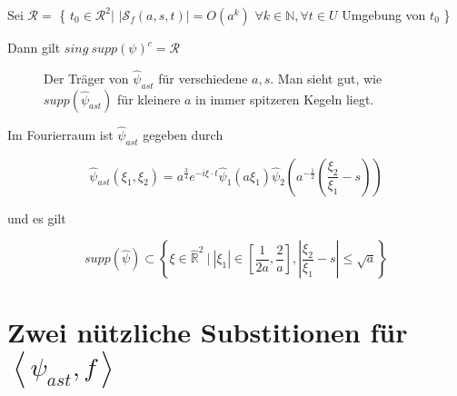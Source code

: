 \begin{corollary}
Sei $\mathcal{R} =$ \{
    $t_0 \in \mathcal{R}^2 \big|$ $|\mathcal{S}_f(a,s,t)| = O(a^k)$
    $\forall k \in \mathbb{N}, \forall t \in U$ Umgebung von $t_0$
    \}

    Dann gilt $sing ~supp (\psi)^c = \mathcal{R}$
\end{corollary}

\begin{remark}

\begin{figure}[h]
\centering

\label{fig:supp_psi_hat}
\caption{Der Träger von $\hat \psi_{ast}$ für verschiedene $a, s$. Man sieht gut,
wie $supp (\hat \psi_{ast})$ für kleinere $a$ in immer spitzeren Kegeln liegt.}
\end{figure}

\label{cor:psi_hat}
Im Fourierraum ist $\hat{\psi}_{ast}$ gegeben durch

\begin{equation}
    \hat \psi_{ast}{(\xi_1, \xi_2)} = a^{\frac{3}{4}}e^{-i\xi \cdot t}\hat\psi_1(a \xi_1) \hat\psi_{2}\left(a^{-\frac{1}{2}}\left(\frac{\xi_2}{\xi_1}-s\right)\right)
\end{equation}

und es gilt

\begin{equation}
\label{eq:supp_psi}
    supp(\hat \psi) \subset \left\{\xi \in  \hat{\mathbb{R}}^2 ~\Big| ~|\xi_1| \in \left[\frac{1}{2 a} , \frac{2}{a}\right], \left|\frac{\xi_2}{\xi_1} - s\right| \leq \sqrt{a} \right\}
\end{equation}

\end{remark}





\section{\texorpdfstring{Zwei nützliche Substitionen für  $\left<\psi_{ast}, f\right>$}{zwei nützliche Substitutionen}}
\label{sec:substitutionen}


